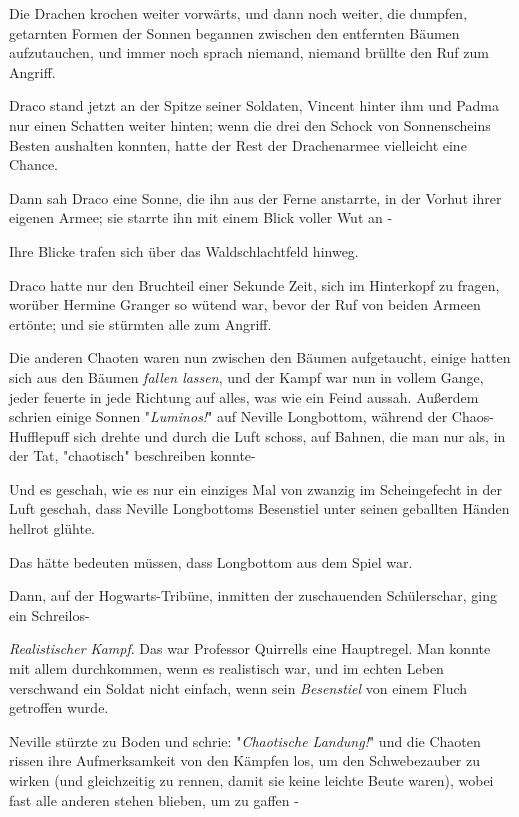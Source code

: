 {Die Drachen krochen weiter vorwärts, und dann noch weiter, die dumpfen, getarnten Formen der Sonnen begannen zwischen den entfernten Bäumen aufzutauchen, und immer noch sprach niemand, niemand brüllte den Ruf zum Angriff.

Draco stand jetzt an der Spitze seiner Soldaten, Vincent hinter ihm und Padma nur einen Schatten weiter hinten; wenn die drei den Schock von Sonnenscheins Besten aushalten konnten, hatte der Rest der Drachenarmee vielleicht eine Chance.

Dann sah Draco eine Sonne, die ihn aus der Ferne anstarrte, in der Vorhut ihrer eigenen Armee; sie starrte ihn mit einem Blick voller Wut an -

Ihre Blicke trafen sich über das Waldschlachtfeld hinweg.

Draco hatte nur den Bruchteil einer Sekunde Zeit, sich im Hinterkopf zu fragen, worüber Hermine Granger so wütend war, bevor der Ruf von beiden Armeen ertönte; und sie stürmten alle zum Angriff.

Die anderen Chaoten waren nun zwischen den Bäumen aufgetaucht, einige hatten sich aus den Bäumen \emph{fallen lassen}, und der Kampf war nun in vollem Gange, jeder feuerte in jede Richtung auf alles, was wie ein Feind aussah. Außerdem schrien einige Sonnen "\emph{Luminos!}" auf Neville Longbottom, während der Chaos-Hufflepuff sich drehte und durch die Luft schoss, auf Bahnen, die man nur als, in der Tat, "chaotisch" beschreiben konnte-

Und es geschah, wie es nur ein einziges Mal von zwanzig im Scheingefecht in der Luft geschah, dass Neville Longbottoms Besenstiel unter seinen geballten Händen hellrot glühte.

Das hätte bedeuten müssen, dass Longbottom aus dem Spiel war.

Dann, auf der Hogwarts-Tribüne, inmitten der zuschauenden Schülerschar, ging ein Schreilos-

\emph{Realistischer Kampf}. Das war Professor Quirrells eine Hauptregel. Man konnte mit allem durchkommen, wenn es realistisch war, und im echten Leben verschwand ein Soldat nicht einfach, wenn sein \emph{Besenstiel} von einem Fluch getroffen wurde.

Neville stürzte zu Boden und schrie: "\emph{Chaotische Landung!}" und die Chaoten rissen ihre Aufmerksamkeit von den Kämpfen los, um den Schwebezauber zu wirken (und gleichzeitig zu rennen, damit sie keine leichte Beute waren), wobei fast alle anderen stehen blieben, um zu gaffen -

}
